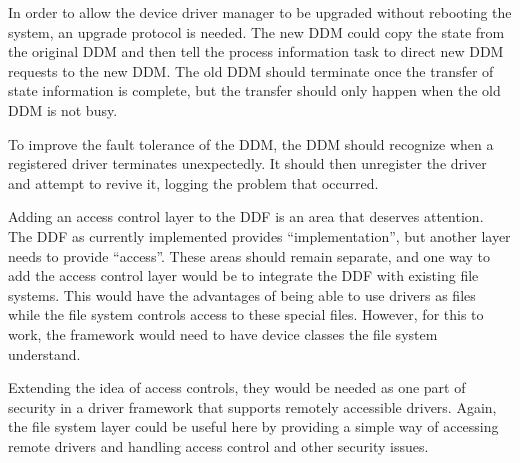 In order to allow the device driver manager to be upgraded without rebooting
the system, an upgrade protocol is needed.  The new DDM could copy the
state from the original DDM and then tell the process information task
to direct new DDM requests to the new DDM.  The old DDM should terminate
once the transfer of state information is complete, but the transfer should
only happen when the old DDM is not busy.

To improve the fault tolerance of the DDM, the DDM should recognize
when a registered driver terminates unexpectedly.  It should then unregister
the driver and attempt to revive it, logging the problem that occurred.


Adding an access control layer to the DDF is an area that deserves attention.
The DDF as currently implemented provides ``implementation'', but another
layer needs to provide ``access''.  These areas should remain separate, and
one way to add the access control layer would be to integrate the DDF
with existing file systems.  This would have the advantages of being able
to use drivers as files while the file system controls access to these
special files.  However, for this to work, the framework would need to
have device classes the file system understand.

Extending the idea of access controls, they would be needed as one part
of security in a driver framework that supports remotely accessible
drivers.  Again, the file system layer could be useful here by providing
a simple way of accessing remote drivers and handling access control
and other security issues.

